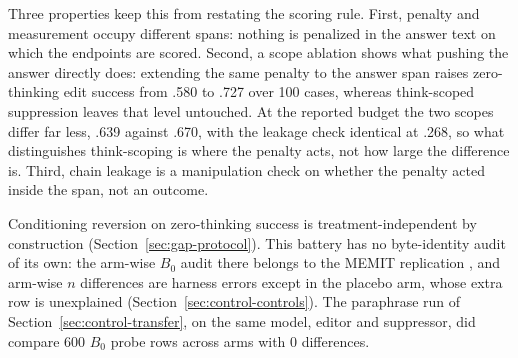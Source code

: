 \documentclass[letterpaper]{article} %
\begin{document}
Three properties keep this from restating the scoring rule.  First, penalty and measurement occupy different spans: nothing is penalized in the answer text on which the endpoints are scored.  Second, a scope ablation shows what pushing the answer directly does: extending the same penalty to the answer span raises zero-thinking edit success from .580 to .727 over 100 cases, whereas think-scoped suppression leaves that level untouched.  At the reported budget the two scopes differ far less, .639 against .670, with the leakage check identical at .268, so what distinguishes think-scoping is where the penalty acts, not how large the difference is.  Third, chain leakage is a manipulation check on whether the penalty acted inside the span, not an outcome. %

Conditioning reversion on zero-thinking success is treatment-independent by construction (Section~\ref{sec:gap-protocol}).  This battery has no byte-identity audit of its own: the arm-wise \(B_0\) audit there belongs to the MEMIT replication \citep{meng2023memit}, and arm-wise \(n\) differences are harness errors except in the placebo arm, whose extra row is unexplained (Section~\ref{sec:control-controls}).  The paraphrase run of Section~\ref{sec:control-transfer}, on the same model, editor and suppressor, did compare \(600\) \(B_0\) probe rows across arms with \(0\) differences. %
\end{document}
